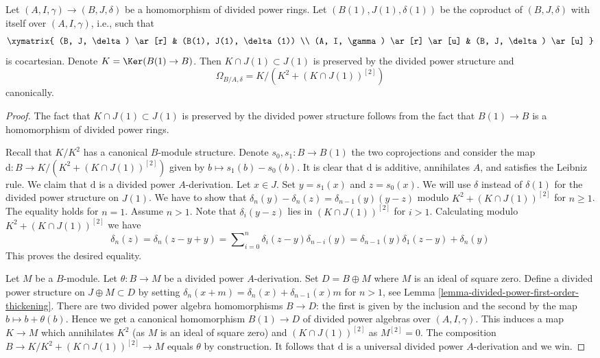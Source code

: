 \begin{lemma}
\label{lemma-diagonal-and-differentials}
Let $(A, I, \gamma) \to (B, J, \delta)$ be a homomorphism
of divided power rings. Let $(B(1), J(1), \delta(1))$ be the coproduct
of $(B, J, \delta)$ with itself over $(A, I, \gamma)$, i.e.,
such that
$$
\xymatrix{
(B, J, \delta) \ar[r] & (B(1), J(1), \delta(1)) \\
(A, I, \gamma) \ar[r] \ar[u] & (B, J, \delta) \ar[u]
}
$$
is cocartesian. Denote $K = \Ker(B(1) \to B)$.
Then $K \cap J(1) \subset J(1)$ is preserved by the divided power
structure and
$$
\Omega_{B/A, \delta} = K/ \left(K^2 + (K \cap J(1))^{[2]}\right)
$$
canonically.
\end{lemma}

\begin{proof}
The fact that $K \cap J(1) \subset J(1)$ is preserved by the divided power
structure follows from the fact that $B(1) \to B$ is a homomorphism of
divided power rings.

\medskip\noindent
Recall that $K/K^2$ has a canonical $B$-module structure.
Denote $s_0, s_1 : B \to B(1)$ the two coprojections and consider
the map $\text{d} : B \to K/(K^2 +(K \cap J(1))^{[2]})$ given by
$b \mapsto s_1(b) - s_0(b)$. It is clear that $\text{d}$ is additive,
annihilates $A$, and satisfies the Leibniz rule.
We claim that $\text{d}$ is a divided power $A$-derivation.
Let $x \in J$. Set $y = s_1(x)$ and $z = s_0(x)$.
We will use $\delta$ instead of $\delta(1)$ for
the divided power structure on $J(1)$.
We have to show that $\delta_n(y) - \delta_n(z) = \delta_{n - 1}(y)(y - z)$
modulo $K^2 +(K \cap J(1))^{[2]}$ for $n \geq 1$.
The equality holds for $n = 1$. Assume $n > 1$.
Note that $\delta_i(y - z)$ lies in $(K \cap J(1))^{[2]}$ for $i > 1$.
Calculating modulo $K^2 + (K \cap J(1))^{[2]}$ we have
$$
\delta_n(z) = \delta_n(z - y + y) =
\sum\nolimits_{i = 0}^n \delta_i(z - y)\delta_{n - i}(y) =
\delta_{n - 1}(y) \delta_1(z - y) + \delta_n(y)
$$
This proves the desired equality.

\medskip\noindent
Let $M$ be a $B$-module. Let $\theta : B \to M$ be a divided power
$A$-derivation.
Set $D = B \oplus M$ where $M$ is an ideal of square zero. Define a
divided power structure on $J \oplus M \subset D$ by setting
$\delta_n(x + m) = \delta_n(x) + \delta_{n - 1}(x)m$ for $n > 1$, see
Lemma \ref{lemma-divided-power-first-order-thickening}.
There are two divided power algebra homomorphisms $B \to D$: the first
is given by the inclusion and the second by the map $b \mapsto b + \theta(b)$.
Hence we get a canonical homomorphism $B(1) \to D$ of divided power
algebras over $(A, I, \gamma)$. This induces a map $K \to M$
which annihilates $K^2$ (as $M$ is an ideal of square zero) and
$(K \cap J(1))^{[2]}$ as $M^{[2]} = 0$. The composition
$B \to K/K^2 + (K \cap J(1))^{[2]} \to M$ equals $\theta$ by construction.
It follows that $\text{d}$
is a universal divided power $A$-derivation and we win.
\end{proof}

